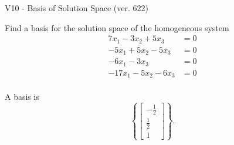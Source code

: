 \begin{exercise}
  \begin{exerciseTitle}V10 - Basis of Solution Space (ver. 622)\end{exerciseTitle}
  \begin{exerciseStatement}
    Find a basis for the solution space of the homogeneous system 
\begin{align*}
 7 x_ 1 -3 x_ 2 + 5 x_ 3 &= 0  \\ 
  -5 x_ 1 + 5 x_ 2 -5 x_ 3 &= 0  \\ 
  -6 x_ 1 -3 x_ 3 &= 0  \\ 
  -17 x_ 1 -5 x_ 2 -6 x_ 3 &= 0  \\ 
 \end{align*}


 
  \end{exerciseStatement}

  \begin{exerciseAnswer}
   A basis is   
\[\left\{\left[\begin{array}{c}
-\frac{1}{2} \\
\frac{1}{2} \\
1
\end{array}\right]\right\}.\]

  


  \end{exerciseAnswer}
\end{exercise}